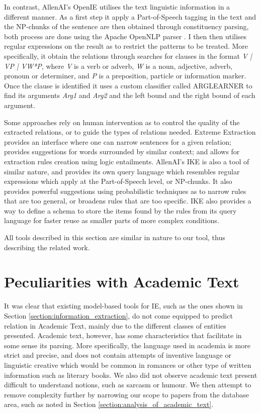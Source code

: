 \documentclass[11pt,a4paper,openright]{memoir}
\begin{document}
In contrast, AllenAI's OpenIE \cite{Etzioni:2011:OIE:2283396.2283398} utilises the text linguistic information in a different manner. As a first step it apply a Part-of-Speech tagging in the text and the NP-chunks of the sentence are then obtained through constituency parsing, both process are done using the Apache OpenNLP parser \cite{open-nlp}. I then then utilises regular expressions on the result as to restrict the patterns to be treated. More specifically, it obtain the relations through searches for clauses in the format \emph{V | VP | VW*P}, where \emph{V} is a verb or adverb, \emph{W} is a noun, adjective, adverb, pronoun or determiner, and \emph{P} is a preposition, particle or information marker. Once the clause is identified it uses a custom classifier called ARGLEARNER to find its arguments \emph{Arg1} and \emph{Arg2} and the left bound and the right bound of each argument.

Some approaches rely on human intervention as to control the quality of the extracted relations, or to guide the types of relations needed. Extreme Extraction \cite{DBLP:journals/corr/HoffmannZW15} provides an interface where one can narrow sentences for a given relation; provides suggestions for words surrounded by similar context; and allows for extraction rules creation using logic entailments. AllenAI's IKE \cite{DBLP:conf/akbc/DalviBCCEFG16} is also a tool of similar nature, and provides its own query language which resembles regular expressions which apply at the Part-of-Speech level, or NP-chunks. It also provides powerful suggestions using probabilistic techniques as to narrow rules that are too general, or broadens rules that are too specific. IKE also provides a way to define a schema to store the items found by the rules from its query language for faster reuse as smaller parts of more complex conditions.

All tools described in this section are similar in nature to our tool, thus describing the related work.


%
%
%
%


\section{Peculiarities with Academic Text}

It was clear that existing model-based tools for IE, such as the ones shown in Section \ref{section:information_extraction}, do not come equipped to predict relation in Academic Text, mainly due to the different classes of entities presented. Academic text, however, has some characteristics that facilitate in some sense its parsing. More specifically, the language used in academia is more strict and precise, and does not contain attempts of inventive language or linguistic creative which would be common in romances or other type of written information such as literary books. We also did not observe academic text present difficult to understand notions, such as sarcasm or humour. We then attempt to remove complexity further by narrowing our scope to papers from the database area, such as noted in Section \ref{section:analysis_of_academic_text}.
\end{document}

